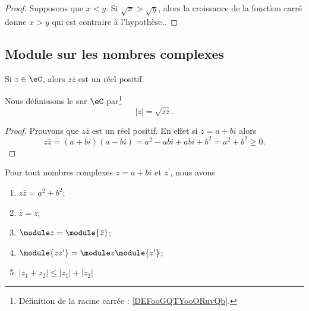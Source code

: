 \begin{proof}
	Supposons que \( x<y\). Si \( \sqrt{ x }>\sqrt{ y }\), alors la croissance de la fonction carré donne \( x>y\) qui est contraire à l'hypothèse..
\end{proof}

\subsection{Module sur les nombres complexes}

\begin{lemmaDef}        \label{LEMooVHDAooJyoakR}
	Si \( z\in \eC\), alors \( z\bar z\) est un réel positif.

	Nous définissons le  sur \( \eC\) par\footnote{Définition de la racine carrée : \ref{DEFooGQTYooORuvQb}.}
	\begin{equation}
		| z |=\sqrt{ z\bar z }.
	\end{equation}
\end{lemmaDef}

\begin{proof}
	Prouvons que \( z\bar z\) est un réel positif. En effet si \( z=a+bi\) alors
	\begin{equation}
		z\bar z=(a+bi)(a-bi)=a^2-abi+abi+b^2=a^2+b^2\geq 0.
	\end{equation}
\end{proof}

\begin{proposition}     \label{PROPooUMVGooIrhZZg}
	Pour tout nombres complexes $z = a+bi$ et $z^\prime$, nous avons
	\begin{enumerate}
		\item       \label{ITEMooYBJVooGXiDSd}
		      \( z \bar z = a^2 + b^2\);
		\item       \label{ITEMooCGLSooKHbzkn}
		      \( \bar{\bar{z}} = z\);
		\item        \label{ITEMooDKWDooUjEuZA}
		      \( \module z = \module {\bar z}\);
		\item       \label{ITEMooFXKYooUOXbwH}
		      \( \module{zz^\prime} = \module z \module{z^\prime}\);
		\item       \label{ITEMooDVMDooFDmOur}
		      \( | z_1+z_2 |\leq | z_1 |+| z_2 |\)
	\end{enumerate}
\end{proposition}

